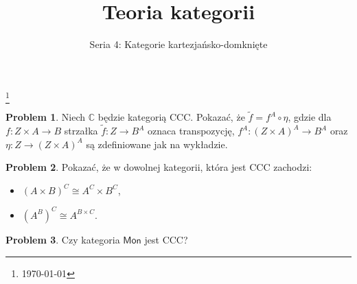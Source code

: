 \documentclass[9pt]{amsart}
\title{Teoria kategorii}
\author{Seria 4: Kategorie kartezjańsko-domknięte}
\theoremstyle{plain}
\theoremstyle{definition}
\newtheorem{problem}{Problem}
\numberwithin{equation}{section}
\newcommand\blfootnote[1]{%
  \begingroup
  \renewcommand\thefootnote{}\footnote{#1}%
  \addtocounter{footnote}{-1}%
  \endgroup
}
\begin{document}
\maketitle

\blfootnote{\today}
\begin{problem}
Niech $\mathbb{C}$ będzie kategorią CCC. Pokazać, że $\tilde{f} = f^A\circ \eta$, gdzie dla $f:Z\times A\to B$ 
strzałka $\tilde{f}:Z\to B^A$ oznaca transpozycję, $f^A:(Z\times A)^A\to B^A$ oraz $\eta:Z\to (Z\times A)^A$ są zdefiniowane 
jak na wykładzie.
\end{problem}

\begin{problem}
Pokazać, że w dowolnej kategorii, która jest CCC zachodzi:
\begin{itemize}
\item $(A\times B)^C \cong A^C\times B^C$,
\item $(A^B)^C \cong A^{B\times C}$.
\end{itemize}
\end{problem}

\begin{problem}
Czy kategoria $\mathsf{Mon}$ jest CCC?
\end{problem}


%
\end{document}
